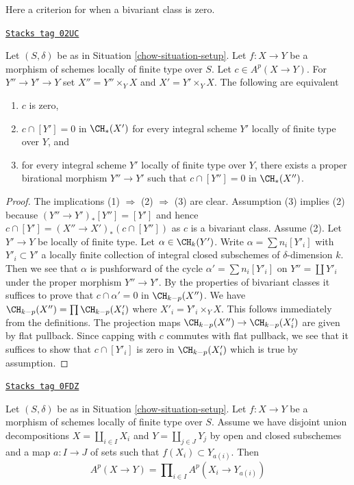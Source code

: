 Here a criterion for when a bivariant class is zero.

\begin{lemma}
\label{chow-lemma-bivariant-zero}
\href{https://stacks.math.columbia.edu/tag/02UC}{\texttt{Stacks tag 02UC}}

Let $(S, \delta)$ be as in Situation \ref{chow-situation-setup}.
Let $f : X \to Y$ be a morphism of schemes locally of finite type over $S$.
Let $c \in A^p(X \to Y)$. For $Y'' \to Y' \to Y$ set
$X'' = Y'' \times_Y X$ and $X' = Y' \times_Y X$.
The following are equivalent
\begin{enumerate}
\item $c$ is zero,
\item $c \cap [Y'] = 0$ in $\CH_*(X')$ for every integral scheme $Y'$
locally of finite type over $Y$, and
\item for every integral scheme $Y'$ locally of finite type over $Y$,
there exists a proper birational morphism $Y'' \to Y'$ such that
$c \cap [Y''] = 0$ in $\CH_*(X'')$.
\end{enumerate}
\end{lemma}

\begin{proof}
The implications (1) $\Rightarrow$ (2) $\Rightarrow$ (3) are clear.
Assumption (3) implies (2) because $(Y'' \to Y')_*[Y''] = [Y']$
and hence $c \cap [Y'] = (X'' \to X')_*(c \cap [Y''])$ as $c$
is a bivariant class. Assume (2).
Let $Y' \to Y$ be locally of finite type. Let $\alpha \in \CH_k(Y')$.
Write $\alpha = \sum n_i [Y'_i]$ with $Y'_i \subset Y'$ a locally finite
collection of integral closed subschemes of $\delta$-dimension $k$.
Then we see that $\alpha$ is pushforward of the cycle
$\alpha' = \sum n_i[Y'_i]$ on $Y'' = \coprod Y'_i$ under the
proper morphism $Y'' \to Y'$. By the properties of bivariant
classes it suffices to prove that $c \cap \alpha' = 0$ in $\CH_{k - p}(X'')$.
We have $\CH_{k - p}(X'') = \prod \CH_{k - p}(X'_i)$ where
$X'_i = Y'_i \times_Y X$. This follows immediately
from the definitions. The projection maps
$\CH_{k - p}(X'') \to \CH_{k - p}(X'_i)$ are given by flat pullback.
Since capping with $c$ commutes with
flat pullback, we see that it suffices to show that $c \cap [Y'_i]$
is zero in $\CH_{k - p}(X'_i)$ which is true by assumption.
\end{proof}

\begin{lemma}
\label{chow-lemma-disjoint-decomposition-bivariant}
\href{https://stacks.math.columbia.edu/tag/0FDZ}{\texttt{Stacks tag 0FDZ}}

Let $(S, \delta)$ be as in Situation \ref{chow-situation-setup}.
Let $f : X \to Y$ be a morphism of schemes locally of finite type over $S$.
Assume we have disjoint union decompositions
$X = \coprod_{i \in I} X_i$ and $Y = \coprod_{j \in J} Y_j$
by open and closed subschemes
and a map $a : I \to J$ of sets such that $f(X_i) \subset Y_{a(i)}$.
Then
$$
A^p(X \to Y) = \prod\nolimits_{i \in I} A^p(X_i \to Y_{a(i)})
$$
\end{lemma}

